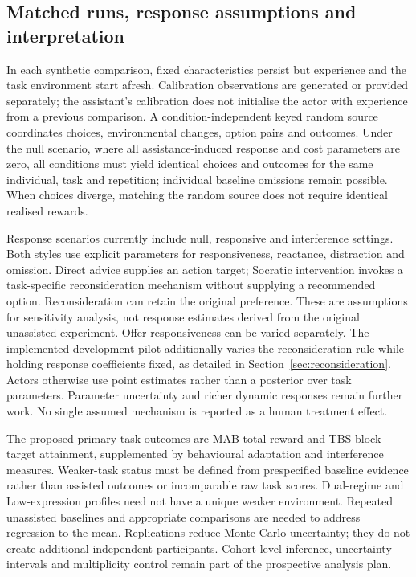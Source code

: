 \documentclass[11pt,a4paper]{article}
\begin{document}
\subsection{Matched runs, response assumptions and interpretation}
In each synthetic comparison, fixed characteristics persist but experience and the task environment start afresh. Calibration observations are generated or provided separately; the assistant's calibration does not initialise the actor with experience from a previous comparison. A condition-independent keyed random source coordinates choices, environmental changes, option pairs and outcomes. Under the null scenario, where all assistance-induced response and cost parameters are zero, all conditions must yield identical choices and outcomes for the same individual, task and repetition; individual baseline omissions remain possible. When choices diverge, matching the random source does not require identical realised rewards.

Response scenarios currently include null, responsive and interference settings. Both styles use explicit parameters for responsiveness, reactance, distraction and omission. Direct advice supplies an action target; Socratic intervention invokes a task-specific reconsideration mechanism without supplying a recommended option. Reconsideration can retain the original preference. These are assumptions for sensitivity analysis, not response estimates derived from the original unassisted experiment. Offer responsiveness can be varied separately. The implemented development pilot additionally varies the reconsideration rule while holding response coefficients fixed, as detailed in Section~\ref{sec:reconsideration}. Actors otherwise use point estimates rather than a posterior over task parameters. Parameter uncertainty and richer dynamic responses remain further work. No single assumed mechanism is reported as a human treatment effect.

The proposed primary task outcomes are MAB total reward and TBS block target attainment, supplemented by behavioural adaptation and interference measures. Weaker-task status must be defined from prespecified baseline evidence rather than assisted outcomes or incomparable raw task scores. Dual-regime and Low-expression profiles need not have a unique weaker environment. Repeated unassisted baselines and appropriate comparisons are needed to address regression to the mean. Replications reduce Monte Carlo uncertainty; they do not create additional independent participants. Cohort-level inference, uncertainty intervals and multiplicity control remain part of the prospective analysis plan.
\end{document}
